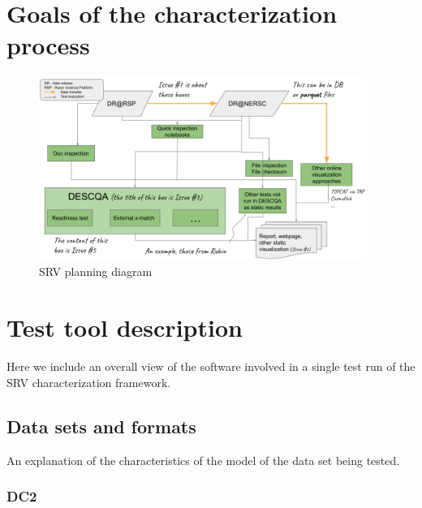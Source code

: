 \documentclass[12pt, a4paper]{article}
\begin{document}
\section{Goals of the characterization process}

\begin{figure}[h]
\begin{center}
\includegraphics[width=0.95\textwidth]{../SRV_planning_diagram.png} 
\caption{SRV planning diagram}
\end{center}
\end{figure}



\section{Test tool description}

Here we include an overall view of the software involved in a single test run of the SRV characterization framework.

\subsection{Data sets and formats}

An explanation of the characteristics of the model of the data set being tested.

\subsubsection{DC2}
\end{document}
